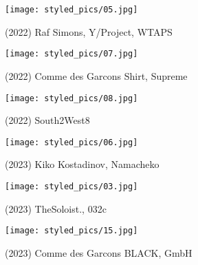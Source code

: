 \begin{minipage}[h!]{0.5\textwidth}
    \begin{figure}[H]
        \texttt{[image: styled\_pics/05.jpg]}
        \caption*{(2022) Raf Simons, Y/Project, WTAPS}
    \end{figure}
\end{minipage}
\begin{minipage}[h!]{0.5\textwidth}
    \begin{figure}[H]
        \texttt{[image: styled\_pics/07.jpg]}
        \caption*{(2022) Comme des Garcons Shirt, Supreme}
    \end{figure}
\end{minipage}
\begin{minipage}[h!]{0.5\textwidth}
    \begin{figure}[H]
        \texttt{[image: styled\_pics/08.jpg]}
        \caption*{(2022) South2West8}
    \end{figure}
\end{minipage}
\begin{minipage}[h!]{0.5\textwidth}
    \begin{figure}[H]
        \texttt{[image: styled\_pics/06.jpg]}
        \caption*{(2023) Kiko Kostadinov, Namacheko}
    \end{figure}
\end{minipage}
\begin{minipage}[h!]{0.5\textwidth}
    \begin{figure}[H]
        \texttt{[image: styled\_pics/03.jpg]}
        \caption*{(2023) TheSoloist., 032c}
    \end{figure}
\end{minipage}
\begin{minipage}[h!]{0.4\textwidth}
    \begin{figure}[H]
        \texttt{[image: styled\_pics/15.jpg]}
        \caption*{(2023) Comme des Garcons BLACK, GmbH}
    \end{figure}
\end{minipage}

